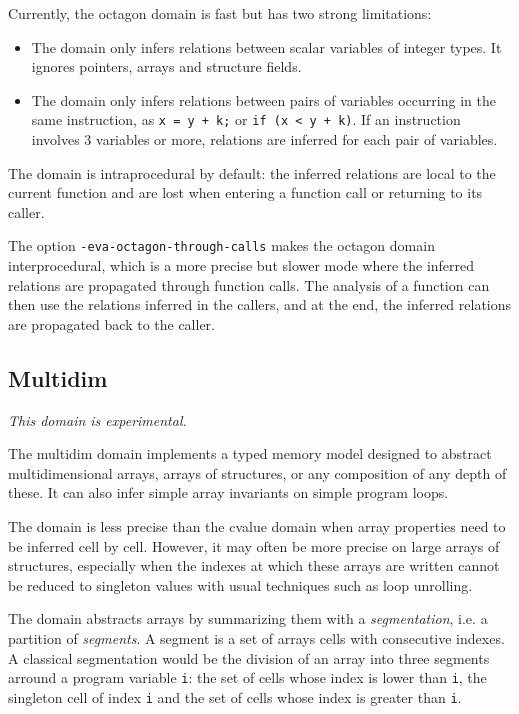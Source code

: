 \documentclass[web]{frama-c-book}
\begin{document}
Currently, the octagon domain is fast but has two strong limitations:
\begin{itemize}
\item
  The domain only infers relations between scalar variables of integer types.
  It ignores pointers, arrays and structure fields.
\item
  The domain only infers relations between pairs of variables occurring in the
  same instruction, as \lstinline|x = y + k;| or \lstinline|if (x < y + k)|.
  If an instruction involves 3 variables or more, relations are inferred for
  each pair of variables.
\end{itemize}

The domain is intraprocedural by default: the inferred relations are local to
the current function and are lost when entering a function call or returning
to its caller.

The option \verb+-eva-octagon-through-calls+ makes the octagon domain
interprocedural, which is a more precise but slower mode where
the inferred relations are propagated through function calls.
The analysis of a function can then use the relations inferred in the callers,
and at the end, the inferred relations are propagated back to the caller.


\subsection{Multidim}
\label{sec:multidim}

\emph{This domain is experimental.}

The multidim domain implements a typed memory model designed to abstract
multidimensional arrays, arrays of structures, or any composition of any depth
of these. It can also infer simple array invariants on simple program loops.

The domain is less precise than the cvalue domain when array properties need
to be inferred cell by cell.
However, it may often be more precise on large arrays of structures, especially
when the indexes at which these arrays are written cannot be
reduced to singleton values with usual techniques such as loop unrolling.

The domain abstracts arrays by summarizing them with a {\it segmentation}, i.e. a
partition of {\it segments}. A segment is a set of arrays cells with consecutive
indexes. A classical segmentation would be the division of an array into three
segments arround a program variable {\tt i}: the set of cells whose index is
lower than {\tt i}, the singleton cell of index {\tt i} and the set of cells
whose index is greater than {\tt i}.
\end{document}
